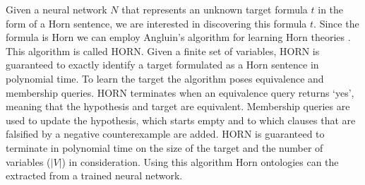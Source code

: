 Given a neural network $N$ that represents an unknown target formula $t$ in the form of a Horn sentence, we are interested in discovering this formula $t$. Since the formula is Horn we can employ Angluin's algorithm for learning Horn theories \cite{DBLP:journals/ml/AngluinFP92}. This algorithm is called HORN. Given a finite set of variables, HORN is guaranteed to exactly identify a target formulated as a Horn sentence in polynomial time. To learn the target the algorithm poses equivalence and membership queries. HORN terminates when an equivalence query returns `yes', meaning that the hypothesis and target are equivalent. Membership queries are used to update the hypothesis, which starts empty and to which clauses that are falsified by a negative counterexample are added. HORN is guaranteed to terminate in polynomial time on the size of the target and the number of variables ($|V|$) in consideration. Using this algorithm Horn ontologies can the extracted from a trained neural network.

